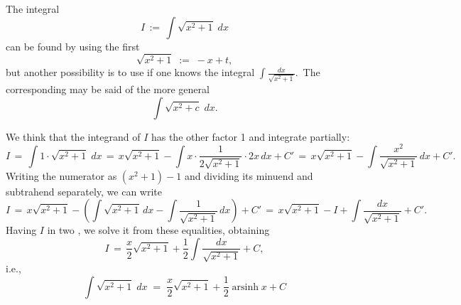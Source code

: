 \documentclass[12pt]{article}
\DeclareMathOperator{\arsinh}{arsinh}
\begin{document}
The integral
$$I \,:=\, \int\!\sqrt{x^2\!+\!1}\;dx$$
can be found by using the first  
$$\sqrt{x^2\!+\!1} \;:=\; -x\!+\!t,$$
but another possibility is to use  if one knows the integral $\int\!\frac{dx}{\sqrt{x^2+1}}$.\, The corresponding may be said of the more general
$$\int\!\sqrt{x^2\!+\!c}\;dx.$$

We think that the integrand of $I$ has the other factor 1 and integrate partially:
$$I \,=\, \int\!1\cdot\sqrt{x^2\!+\!1}\;dx \,=\, x\sqrt{x^2\!+\!1}-\!\int\!x\cdot\frac{1}{2\sqrt{x^2\!+\!1}}\cdot2x\,dx+C' 
\,=\, x\sqrt{x^2\!+\!1}-\!\int\!\frac{x^2}{\sqrt{x^2\!+\!1}}\,dx+C'.$$
Writing the numerator as $(x^2\!+\!1)\!-\!1$ and dividing its minuend and subtrahend separately, we can write
$$ I \,=\, x\sqrt{x^2\!+\!1}-\!\left(\!\int\!\sqrt{x^2\!+\!1}\,dx-\!\int\!\frac{1}{\sqrt{x^2\!+\!1}}\,dx\right)+C' \,=\,
x\sqrt{x^2\!+\!1}-I+\!\int\!\frac{dx}{\sqrt{x^2\!+\!1}}+C'.$$
Having $I$ in two , we solve it from these equalities, obtaining
$$I \,=\, \frac{x}{2}\sqrt{x^2\!+\!1}+\frac{1}{2}\!\int\frac{dx}{\sqrt{x^2\!+\!1}}+C,$$
i.e.,
$$\int\!\sqrt{x^2\!+\!1}\;dx \;=\; \frac{x}{2}\sqrt{x^2\!+\!1}+\frac{1}{2}\arsinh{x}+C$$

\end{document}
